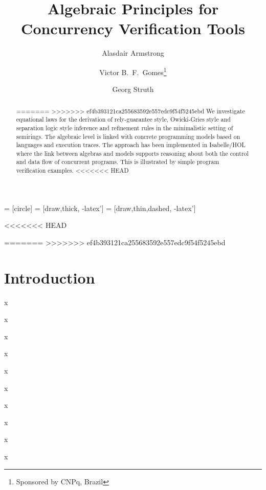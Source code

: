 \documentclass{llncs}
\begin{document}
 = [circle]
 = [draw,thick, -latex']
 = [draw,thin,dashed, -latex']

\title{Algebraic Principles for Concurrency Verification Tools}

\author{Alasdair Armstrong \and Victor B.~F.~Gomes\thanks{Sponsored by CNPq, Brazil} \and Georg Struth}


\maketitle

<<<<<<< HEAD
\begin{abstract}
=======
>>>>>>> ef4b393121ca255683592e557edc9f54f5245ebd
We investigate equational laws for the derivation of rely-guarantee
style, Owicki-Gries style and separation logic style inference and
refinement rules in the minimalistic setting of semirings. The
algebraic level is linked with concrete programming models based on
languages and execution traces. The approach has been implemented in
Isabelle/HOL where the link between algebras and models supports
reasoning about both the control and data flow of concurrent
programs. This is illustrated by simple program verification examples.
<<<<<<< HEAD
\end{abstract}
=======
>>>>>>> ef4b393121ca255683592e557edc9f54f5245ebd

\pagestyle{plain}

\section{Introduction}

\cite{hoare_concurrent_2011}
\cite{kozen_completeness_1994}
\cite{kozen_kleene_1997}
\cite{armstrong_kleene_2013}
\cite{nipkow_isabelle/hol:_2002}

x

x

x

x

x

x

x

x

x

x
\end{document}
